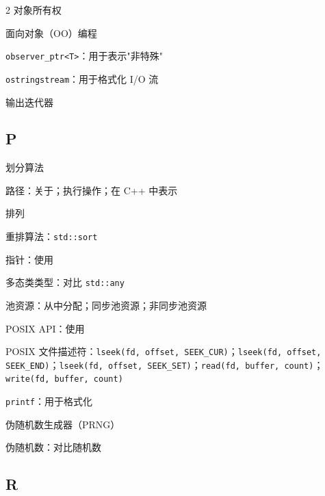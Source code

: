 \begin{multicols}{2}
\noindent 对象所有权\par
\noindent 面向对象（OO）编程\par
\noindent \texttt{observer\_\allowbreak{}ptr<\allowbreak{}T>\allowbreak{}}：用于表示"非特殊"\par
\noindent \texttt{ostringstream}：用于格式化 I/O 流\par
\noindent 输出迭代器\par

\subsection*{P}

\noindent 划分算法\par
\noindent 路径：关于；执行操作；在 C++ 中表示\par
\noindent 排列\par
\noindent 重排算法：\texttt{std::\allowbreak{}sort}\par
\noindent 指针：使用\par
\noindent 多态类类型：对比 \texttt{std::\allowbreak{}any}\par
\noindent 池资源：从中分配；同步池资源；非同步池资源\par
\noindent POSIX API：使用\par
\noindent POSIX 文件描述符：\texttt{lseek(\allowbreak{}fd,\allowbreak{} offset,\allowbreak{} SEEK\_\allowbreak{}CUR)\allowbreak{}}；\texttt{lseek(\allowbreak{}fd,\allowbreak{} offset,\allowbreak{} SEEK\_\allowbreak{}END)\allowbreak{}}；\texttt{lseek(\allowbreak{}fd,\allowbreak{} offset,\allowbreak{} SEEK\_\allowbreak{}SET)\allowbreak{}}；\texttt{read(\allowbreak{}fd,\allowbreak{} buffer,\allowbreak{} count)\allowbreak{}}；\texttt{write(\allowbreak{}fd,\allowbreak{} buffer,\allowbreak{} count)\allowbreak{}}\par
\noindent \texttt{printf}：用于格式化\par
\noindent 伪随机数生成器（PRNG）\par
\noindent 伪随机数：对比随机数\par

\subsection*{R}


\end{multicols}
